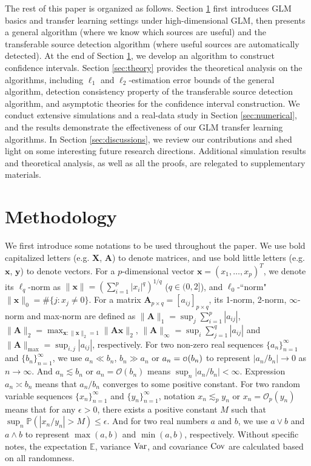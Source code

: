 \documentclass[12pt]{article}
\newcommand{\tp}{\mathbb{P}}
\newcommand{\te}{\mathbb{E}}
\newcommand{\cov}{\textup{Cov}}
\newcommand{\var}{\textup{Var}}
\newcommand{\infnorm}[1]{\|#1\|_{\infty}}
\newcommand{\twonorm}[1]{\|#1\|_{2}}
\newcommand{\onenorm}[1]{\|#1\|_{1}}
\newcommand{\zeronorm}[1]{\|#1\|_{0}}
\newcommand{\maxnorm}[1]{\|#1\|_{\max}}
\newcommand{\norm}[1]{|#1|}
\newcommand{\bx}{\bm{x}}
\newcommand{\by}{\bm{y}}
\newcommand{\bX}{\bm{X}}
\newcommand{\<}{\langle}
\renewcommand{\>}{\rangle}
\newcommand\smallo{
  \mathchoice
    {{\scriptstyle\mathcal{O}}}%
    {{\scriptstyle\mathcal{O}}}%
    {{\scriptscriptstyle\mathcal{O}}}%
    {\scalebox{.7}{$\scriptscriptstyle\mathcal{O}$}}%
}
\begin{document}
The rest of this paper is organized as follows. Section \ref{sec:method} first introduces GLM basics and transfer learning settings under high-dimensional GLM, then presents a general algorithm (where we know which sources are useful) and the transferable source detection algorithm (where useful sources are automatically detected). At the end of Section \ref{sec:method}, we develop an algorithm to construct confidence intervals. Section \ref{sec:theory} provides the theoretical analysis on the algorithms, including $\ell_1$ and $\ell_2$-estimation error bounds of the general algorithm, detection consistency property of the transferable source detection algorithm, and asymptotic theories for the confidence interval construction. We conduct extensive simulations and a real-data study in Section \ref{sec:numerical}, and the results demonstrate the effectiveness of our GLM transfer learning algorithms. In Section \ref{sec:discussions}, we review our contributions and shed light on some interesting future research directions. Additional simulation results and theoretical analysis, as well as all the proofs, are relegated to supplementary materials.


\section{Methodology}\label{sec:method}
We first introduce some notations to be used throughout the paper. We use bold capitalized letters (e.g. $\bX$, $\bm{A}$) to denote matrices, and use bold little letters (e.g. $\bx$, $\by$) to denote vectors. For a $p$-dimensional vector $\bx = (x_1,\ldots, x_p)^T$, we denote its $\ell_q$-norm as $\|\bx\| = (\sum_{i=1}^p \norm{x_i}^q)^{1/q}$ ($q \in (0, 2]$), and $\ell_0$-``norm" $\zeronorm{\bx} = \#\{j: x_j \neq 0\}$. For a matrix $\bm{A}_{p \times q} = [a_{ij}]_{p \times q}$, its 1-norm, 2-norm, $\infty$-norm and max-norm are defined as $\onenorm{\bm{A}} = \sup_{j}\sum_{i=1}^p |a_{ij}|$, $\twonorm{\bm{A}} = \max_{\bx: \twonorm{\bx}=1}\twonorm{\bm{A}\bx}$, $\infnorm{\bm{A}} = \sup_{i}\sum_{j=1}^q |a_{ij}|$ and $\maxnorm{\bm{A}} = \sup_{i,j}|a_{ij}|$, respectively. For two non-zero real sequences $\{a_n\}_{n=1}^{\infty}$ and $\{b_n\}_{n=1}^{\infty}$, we use $a_n \ll b_n$, $b_n \gg a_n$ or $a_n = \smallo(b_n)$ to represent $|a_n/b_n| \rightarrow 0$ as $n \rightarrow \infty$. And $a_n \lesssim b_n$ or $a_n = \mathcal{O}(b_n)$ means $\sup_n|a_n/b_n| < \infty$. Expression $a_n \asymp b_n$ means that $a_n/b_n$ converges to some positive constant. For two random variable sequences $\{x_n\}_{n=1}^{\infty}$ and $\{y_n\}_{n=1}^{\infty}$, notation $x_n \lesssim_p y_n$ or $x_n = \mathcal{O}_p(y_n)$ means that for any $\epsilon > 0$, there exists a positive constant $M$ such that $\sup_n\tp(|x_n/y_n|> M) \leq \epsilon$. And for two real numbers $a$ and $b$, we use $a \vee b$ and $a\wedge b$ to represent $\max(a, b)$ and $\min(a, b)$, respectively. Without specific notes, the expectation $\te$, variance $\var$, and covariance $\cov$ are calculated based on all randomness.
\end{document}
